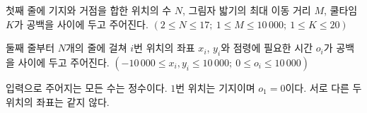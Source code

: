 첫째 줄에 기지와 거점을 합한 위치의 수 $N$, 그림자 밟기의 최대 이동 거리 $M$, 쿨타임 $K$가 공백을 사이에 두고 주어진다. $(2 \le N \le 17;\ 1 \le M \le 10\,000;\ 1 \le K \le 20)$

둘째 줄부터 $N$개의 줄에 걸쳐 $i$번 위치의 좌표 $x_i$, $y_i$와 점령에 필요한 시간 $o_i$가 공백을 사이에 두고 주어진다. $(-10\,000 \le x_i, y_i \le 10\,000;\ 0 \le o_i \le 10\,000)$

입력으로 주어지는 모든 수는 정수이다. $1$번 위치는 기지이며 $o_1=0$이다. 서로 다른 두 위치의 좌표는 같지 않다.
